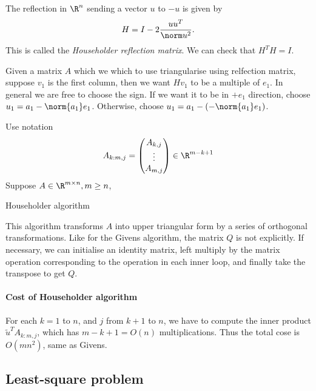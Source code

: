 \documentclass[a4paper]{article}
\begin{document}
The reflection in \(\R^n\) sending a vector \(u\) to \(-u\) is given by
\[
  H = I - 2 \frac{uu^T}{\norm u^2}.
\]
This is called the \emph{Householder reflection matrix}. We can check that \(H^TH = I\).

Given a matrix \(A\) which we which to use triangularise using relfection matrix, suppose \(v_1\) is the first column, then we want \(Hv_1\) to be a multiple of \(e_1\). In general we are free to choose the sign. If we want it to be in \(+e_1\) direction, choose \(u_1 = a_1 - \norm{a_1}e_1\). Otherwise, choose \(u_1 = a_1 - (-\norm{a_1}e_1)\).

Use notation
\[
  A_{k:m, j} =
  \begin{pmatrix}
    A_{k, j} \\
    \vdots \\
    A_{m, j}
  \end{pmatrix}
  \in \R^{m - k + 1}
\]
Suppose \(A \in \R^{m \times n}, m \geq n\),

\begin{algorithm}
  \caption{Householder algorithm}
\end{algorithm}

This algorithm transforms \(A\) into upper triangular form by a series of orthogonal transformations. Like for the Givens algorithm, the matrix \(Q\) is not explicitly. If necessary, we can initialise an identity matrix, left multiply by the matrix operation corresponding to the operation in each inner loop, and finally take the transpose to get \(Q\).

\paragraph{Cost of Householder algorithm}

For each \(k = 1\) to \(n\), and \(j\) from \(k + 1\) to \(n\), we have to compute the inner product \(\tilde u^T A_{k:m, j}\), which has \(m - k + 1 = O(n)\) multiplications. Thus the total cose is \(O(mn^2)\), same as Givens.

\subsection{Least-square problem}
\end{document}
